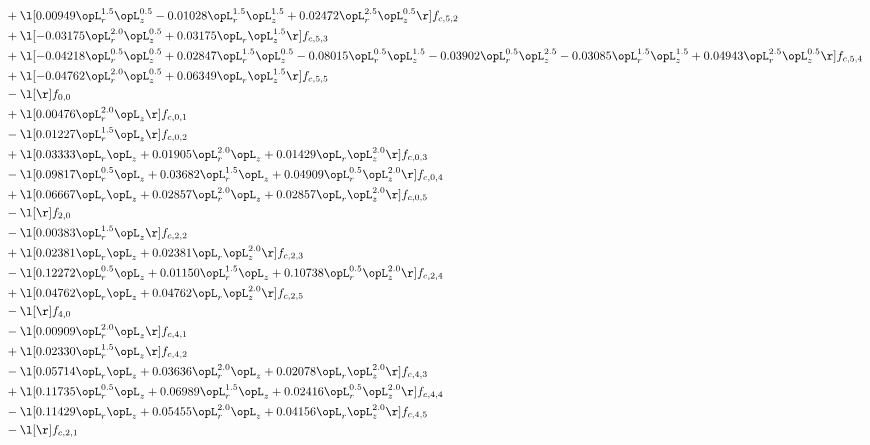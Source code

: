 \begin{alignat}{2}
& + \l[  0.00949 \opL_r^{1.5} \opL_z^{0.5}   -0.01028 \opL_r^{1.5} \opL_z^{1.5} +  0.02472 \opL_r^{2.5} \opL_z^{0.5}  \r] f_{c,5,2} \nonumber \\ 
& + \l[  -0.03175 \opL_r^{2.0} \opL_z^{0.5} +  0.03175 \opL_r \opL_z^{1.5}  \r] f_{c,5,3} \nonumber \\ 
& + \l[  -0.04218 \opL_r^{0.5} \opL_z^{0.5} +  0.02847 \opL_r^{1.5} \opL_z^{0.5}   -0.08015 \opL_r^{0.5} \opL_z^{1.5}   -0.03902 \opL_r^{0.5} \opL_z^{2.5}   -0.03085 \opL_r^{1.5} \opL_z^{1.5} +  0.04943 \opL_r^{2.5} \opL_z^{0.5}  \r] f_{c,5,4} \nonumber \\ 
& + \l[  -0.04762 \opL_r^{2.0} \opL_z^{0.5} +  0.06349 \opL_r \opL_z^{1.5}  \r] f_{c,5,5} \nonumber \\ 
& - \l[  \r] f_{0,0} \nonumber \\ 
& + \l[  0.00476 \opL_r^{2.0} \opL_z  \r] f_{c,0,1} \nonumber \\ 
& - \l[  0.01227 \opL_r^{1.5} \opL_z  \r] f_{c,0,2} \nonumber \\ 
& + \l[  0.03333 \opL_r \opL_z +  0.01905 \opL_r^{2.0} \opL_z +  0.01429 \opL_r \opL_z^{2.0}  \r] f_{c,0,3} \nonumber \\ 
& - \l[  0.09817 \opL_r^{0.5} \opL_z +  0.03682 \opL_r^{1.5} \opL_z +  0.04909 \opL_r^{0.5} \opL_z^{2.0}  \r] f_{c,0,4} \nonumber \\ 
& + \l[  0.06667 \opL_r \opL_z +  0.02857 \opL_r^{2.0} \opL_z +  0.02857 \opL_r \opL_z^{2.0}  \r] f_{c,0,5} \nonumber \\ 
& - \l[  \r] f_{2,0} \nonumber \\ 
& - \l[  0.00383 \opL_r^{1.5} \opL_z  \r] f_{c,2,2} \nonumber \\ 
& + \l[  0.02381 \opL_r \opL_z +  0.02381 \opL_r \opL_z^{2.0}  \r] f_{c,2,3} \nonumber \\ 
& - \l[  0.12272 \opL_r^{0.5} \opL_z +  0.01150 \opL_r^{1.5} \opL_z +  0.10738 \opL_r^{0.5} \opL_z^{2.0}  \r] f_{c,2,4} \nonumber \\ 
& + \l[  0.04762 \opL_r \opL_z +  0.04762 \opL_r \opL_z^{2.0}  \r] f_{c,2,5} \nonumber \\ 
& - \l[  \r] f_{4,0} \nonumber \\ 
& - \l[  0.00909 \opL_r^{2.0} \opL_z  \r] f_{c,4,1} \nonumber \\ 
& + \l[  0.02330 \opL_r^{1.5} \opL_z  \r] f_{c,4,2} \nonumber \\ 
& - \l[  0.05714 \opL_r \opL_z +  0.03636 \opL_r^{2.0} \opL_z +  0.02078 \opL_r \opL_z^{2.0}  \r] f_{c,4,3} \nonumber \\ 
& + \l[  0.11735 \opL_r^{0.5} \opL_z +  0.06989 \opL_r^{1.5} \opL_z +  0.02416 \opL_r^{0.5} \opL_z^{2.0}  \r] f_{c,4,4} \nonumber \\ 
& - \l[  0.11429 \opL_r \opL_z +  0.05455 \opL_r^{2.0} \opL_z +  0.04156 \opL_r \opL_z^{2.0}  \r] f_{c,4,5} \nonumber \\ 
& - \l[  \r] f_{c,2,1} \nonumber \\ 
\end{alignat} 



